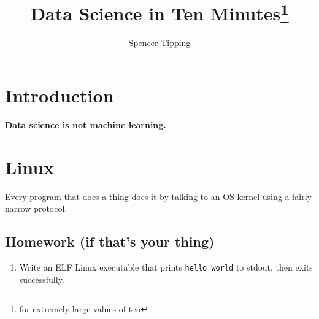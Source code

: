 \documentclass{article}
\title{Data Science in Ten Minutes\footnote{for extremely large values of ten}}
\author{Spencer Tipping}
\begin{document}
  \maketitle
  \tableofcontents

  \section{Introduction}
  {\bf Data science is not machine learning.}

  \newpage
  \section{Linux}
  Every program that does a thing does it by talking to an OS kernel using a
  fairly narrow protocol.

  \subsection{Homework (if that's your thing)}
  \begin{enumerate}
    \item Write an ELF Linux executable that prints {\tt hello world} to stdout,
          then exits successfully.
  \end{enumerate}
\end{document}
